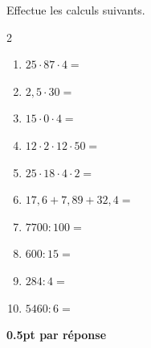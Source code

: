 
\question[5]
Effectue les calculs suivants.	

\vspace{10pt}
\setlength{\columnsep}{50pt}
\begin{multicols}{2}
\begin{enumerate}[leftmargin=*,align=parleft, label=\alph*), itemsep=15pt]
\item $25 \cdot 87 \cdot 4 =$ 
\item $2,5 \cdot 30=$ 
\item $15 \cdot 0 \cdot 4=$ 
\item $12 \cdot 2 \cdot 12 \cdot 50=$ 
\item $25 \cdot 18 \cdot 4 \cdot 2=$ 
\item $17,6 + 7,89 + 32,4=$ 
\item $7700 : 100=$ 
\item $600 : 15=$ 
\item $284 : 4=$ 
\item $5460 : 6=$ 
\end{enumerate}
\end{multicols}
\setlength{\columnsep}{10pt}

\begin{solution}[0pt]
\textbf{0.5pt par réponse}
\end{solution}